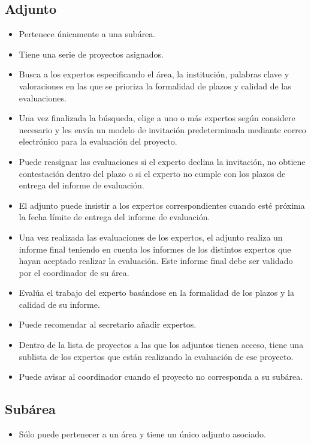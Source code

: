 \documentclass[11pt,a4paper,spanish,twoside]{book}
\begin{document}
\subsection{Adjunto}
\begin{itemize}
\item Pertenece únicamente a una subárea.
\item Tiene una serie de proyectos asignados.
\item Busca a los expertos especificando el área, la institución, palabras
  clave y valoraciones en las que se prioriza la formalidad de plazos y
  calidad de las evaluaciones. 
\item Una vez finalizada la búsqueda, elige a uno o más expertos según
  considere necesario y les envía un modelo de invitación predeterminada
  mediante correo electrónico para la evaluación del proyecto.  
\item Puede reasignar las evaluaciones si el experto declina la invitación,
  no obtiene contestación dentro del plazo o si el experto no cumple con los
  plazos de entrega del informe de evaluación.
\item El adjunto puede insistir a los expertos correspondientes cuando esté
  próxima la fecha límite de entrega del informe de evaluación.
\item Una vez realizada las evaluaciones de los expertos, el adjunto
  realiza un informe final teniendo en cuenta los informes de los distintos
  expertos que hayan aceptado realizar la evaluación. Este informe final
  debe ser validado por el coordinador de su área. 
\item Evalúa el trabajo del experto basándose en la formalidad de los plazos
  y la calidad de su informe. 
\item Puede recomendar al secretario añadir expertos.
\item Dentro de la lista de proyectos a las que los adjuntos tienen acceso,
  tiene una sublista de los expertos que están realizando la evaluación de
  ese proyecto.  
\item Puede avisar al coordinador cuando el proyecto no corresponda a su
  subárea. 
\end{itemize}

\subsection{Subárea}
\begin{itemize}
\item Sólo puede pertenecer a un área y tiene un único adjunto asociado.
\end{itemize}
\end{document}
